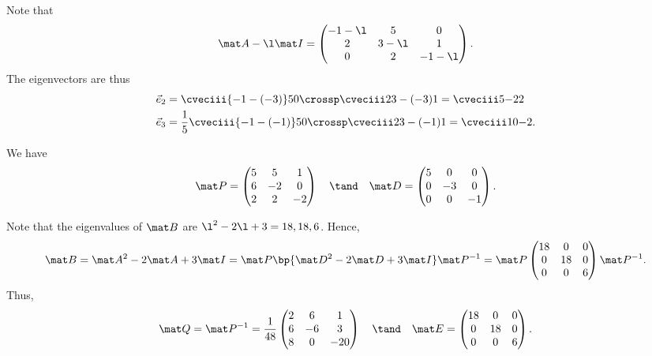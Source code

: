 \begin{solution}
\begin{ppart}
        Note that \[\mat A - \l \mat I = \begin{pmatrix}-1 - \l & 5 & 0 \\ 2 & 3-\l & 1 \\ 0 & 2 & -1-\l\end{pmatrix}.\] The eigenvectors are thus
        \begin{align*}
            \vec e_2 &= \cveciii{-1-(-3)}50 \crossp \cveciii2{3-(-3)}1 = \cveciii5{-2}2\\
            \vec e_3 &= \frac15 \cveciii{-1-(-1)}50 \crossp \cveciii2{3-(-1)}1 = \cveciii10{-2}.
        \end{align*}
    \end{ppart}
    \begin{ppart}
        We have \[\mat P = \begin{pmatrix}5 & 5 & 1 \\ 6 & -2 & 0 \\ 2 & 2 & -2\end{pmatrix} \quad \tand \quad \mat D = \begin{pmatrix}5 & 0 & 0 \\ 0 & -3 & 0 \\ 0 & 0 & -1\end{pmatrix}.\]
    \end{ppart}
    \begin{ppart}
        Note that the eigenvalues of $\mat B$ are $\l^2 - 2\l + 3 = 18, 18, 6$. Hence, \[\mat B = \mat A^2 - 2 \mat A + 3 \mat I = \mat P \bp{\mat D^2 - 2\mat D + 3\mat I} \mat P^{-1} = \mat P \begin{pmatrix}18 & 0 & 0 \\ 0 & 18 & 0 \\ 0 & 0 & 6\end{pmatrix} \mat P^{-1}.\] Thus, \[\mat Q = \mat P^{-1} = \frac1{48} \begin{pmatrix}2 & 6 & 1 \\ 6 & -6 & 3 \\ 8 & 0 & -20\end{pmatrix} \quad \tand \quad \mat E = \begin{pmatrix}18 & 0 & 0 \\ 0 & 18 & 0 \\ 0 & 0 & 6\end{pmatrix}.\]
    \end{ppart}
\end{solution}

